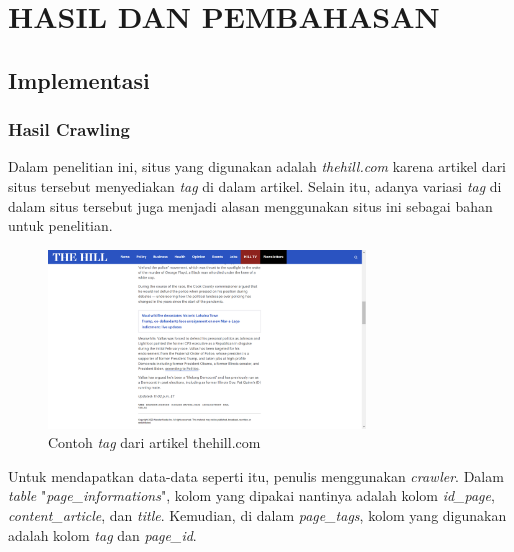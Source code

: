 
\chapter{HASIL DAN PEMBAHASAN}

\section{Implementasi}

\subsection{Hasil Crawling}

Dalam penelitian ini, situs yang digunakan adalah \textit{thehill.com} 
karena artikel dari situs tersebut menyediakan \textit{tag} di dalam 
artikel. Selain itu, adanya variasi \textit{tag} di dalam situs 
tersebut juga menjadi alasan menggunakan situs ini sebagai bahan 
untuk penelitian.

\begin{figure}[H]
  \centering
  \includegraphics[width=0.75\textwidth]{gambar/bab_4_image/the-hill.png}
  \caption{Contoh \textit{tag} dari artikel thehill.com}
  \label{gambar:thehill}
\end{figure}

Untuk mendapatkan data-data seperti itu, penulis menggunakan 
\textit{crawler}. Dalam \emph{table} "\emph{page\_informations}", kolom yang dipakai 
nantinya adalah kolom \textit{id\_page}, \textit{content\_article}, 
dan \textit{title}. Kemudian, di dalam \textit{page\_tags}, 
kolom yang digunakan adalah kolom \textit{tag} dan \textit{page\_id}.  

